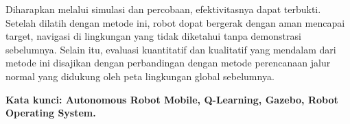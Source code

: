 Diharapkan melalui simulasi dan percobaan, efektivitasnya dapat terbukti. Setelah dilatih dengan metode ini, robot dopat bergerak dengan aman mencapai target, navigasi di lingkungan yang tidak diketahui tanpa demonstrasi sebelumnya. Selain itu, evaluasi kuantitatif dan kualitatif yang mendalam dari metode ini disajikan dengan perbandingan dengan metode perencanaan jalur normal yang didukung oleh peta lingkungan global sebelumnya.

\textbf{Kata kunci: Autonomous Robot Mobile, Q-Learning, Gazebo, Robot Operating System.} 